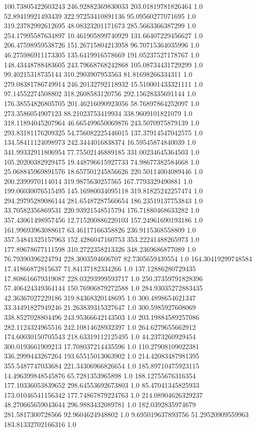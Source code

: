 100.73805422603243	246.92882369830033	203.01819781826464	1.0
52.89419921493439	322.97253410891136	95.09560277071695	1.0
319.23782992612695	48.08323201171673	285.5663366387299	1.0
254.17995587634897	10.461905899740929	131.66407229456627	1.0
206.47598959538726	151.26715804213958	96.70715364035996	1.0
46.275986911173305	135.6419916578669	191.05237527178767	1.0
148.43448788483605	243.79668768242868	105.08734431729299	1.0
99.40215318735144	310.2903907953563	81.81698266334311	1.0
279.08381786749914	246.20132792118932	15.510001433321111	1.0
97.14552274508802	318.2608583120756	292.15628335691144	1.0
176.38554826805705	201.46216090923056	58.76897864252097	1.0
273.3586054907123	88.21023753419934	338.9609101821079	1.0
318.11894045207964	46.665499650069876	243.5070975879139	1.0
293.83181176209325	54.756082225446015	137.37914547042575	1.0
134.58411124098973	242.3444016838374	16.59545874840039	1.0
341.99332911806954	77.75502146889185	331.00234645364503	1.0
105.20200382929475	19.448796615927733	74.98677382584668	1.0
25.068845969891576	18.657501245856626	220.50114004089446	1.0
200.2399970114014	319.9875630257565	167.7793329490881	1.0
199.06030076515495	145.16980034095118	319.81825242257474	1.0
294.29795289086144	281.65487287560654	186.23519137753843	1.0
33.70582356869531	220.93921548515794	176.71880468633282	1.0
357.43061498957456	12.715200886220103	157.24961690193186	1.0
161.99693963088617	63.46117166358826	236.9115368558809	1.0
357.54841325157963	152.4286047160753	353.22241488265973	1.0
177.89678677111598	310.2722358213326	348.2369686877089	1.0
76.79390396224794	228.3003594606707	82.7305659439554	1.0
164.30419299748584	17.41866872815637	71.84137182334266	1.0
137.12886280729435	17.808616679319087	228.03293999593717	1.0
250.37359791828396	57.406424349364144	150.76906879272588	1.0
284.93035272883435	42.36367027229186	319.84368320148695	1.0
300.4898654621347	33.34491827949246	21.263839315327647	1.0
300.5985927608069	338.8527028804496	243.95366642143503	1.0
203.19884589257086	282.1124324965516	242.10814628932397	1.0
264.6279655662912	174.60030150705543	218.63319112125495	1.0
44.2373260929454	300.0193661909213	17.708037214435596	1.0
110.27908109022381	336.2999443267264	193.65515013063902	1.0
214.42083487981395	355.5487747033684	221.34306966826654	1.0
185.89710475923115	14.496399848545876	65.7281353965898	1.0
188.12755676316354	177.10336053839652	298.64553692673803	1.0
85.47041345825933	173.01046541156342	177.74867879224763	1.0
214.08904626329237	48.270665659043644	296.9883432089781	1.0
182.0392835974679	281.5817300728566	92.9604624948802	1.0
9.695019637893756	51.29520909559963	183.81332702166316	1.0
